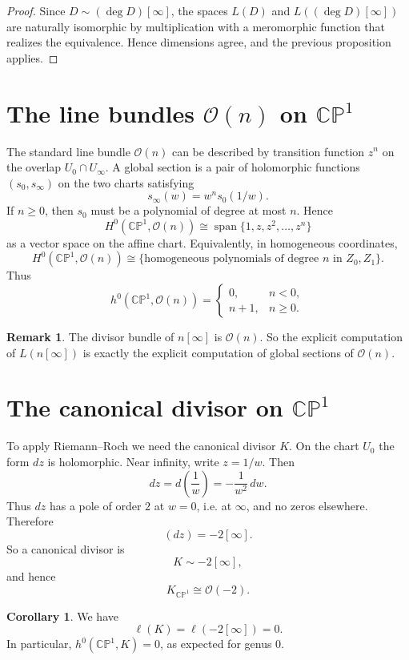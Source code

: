 \documentclass[11pt]{article}
\newcommand{\CP}{\mathbb{CP}}
\newcommand{\OO}{\mathcal{O}}
\newcommand{\degd}{\operatorname{deg}}
\newcommand{\ellD}{\ell}
\newcommand{\CPone}{\CP^1}
\theoremstyle{definition}
\newtheorem{remark}[definition]{Remark}
\newtheorem{corollary}[definition]{Corollary}
\theoremstyle{plain}
\begin{document}
\begin{proof}
Since $D\sim (\degd D)[\infty]$, the spaces $L(D)$ and $L((\degd D)[\infty])$ are naturally isomorphic by multiplication with a meromorphic function that realizes the equivalence. Hence dimensions agree, and the previous proposition applies.
\end{proof}

\section{The line bundles \texorpdfstring{$\OO(n)$}{O(n)} on \texorpdfstring{$\CPone$}{CP1}}
The standard line bundle $\OO(n)$ can be described by transition function $z^n$ on the overlap $U_0\cap U_\infty$.
A global section is a pair of holomorphic functions $(s_0,s_\infty)$ on the two charts satisfying
\[
s_\infty(w)=w^n s_0(1/w).
\]
If $n\ge 0$, then $s_0$ must be a polynomial of degree at most $n$.
Hence
\[
H^0(\CPone,\OO(n))\cong \operatorname{span}\{1,z,z^2,\dots,z^n\}
\]
as a vector space on the affine chart.
Equivalently, in homogeneous coordinates,
\[
H^0(\CPone,\OO(n))\cong \{
\text{homogeneous polynomials of degree }n\text{ in }Z_0,Z_1
\}.
\]
Thus
\[
h^0(\CPone,\OO(n))=
\begin{cases}
0,& n<0,\\
 n+1,& n\ge 0.
\end{cases}
\]

\begin{remark}
The divisor bundle of $n[\infty]$ is $\OO(n)$. So the explicit computation of $L(n[\infty])$ is exactly the explicit computation of global sections of $\OO(n)$.
\end{remark}

\section{The canonical divisor on \texorpdfstring{$\CPone$}{CP1}}
To apply Riemann--Roch we need the canonical divisor $K$.
On the chart $U_0$ the form $dz$ is holomorphic. Near infinity, write $z=1/w$. Then
\[
dz=d\left(\frac{1}{w}\right)=-\frac{1}{w^2}\,dw.
\]
Thus $dz$ has a pole of order $2$ at $w=0$, i.e. at $\infty$, and no zeros elsewhere. Therefore
\[
(dz)=-2[\infty].
\]
So a canonical divisor is
\[
K\sim -2[\infty],
\]
and hence
\[
K_{\CPone}\cong \OO(-2).
\]

\begin{corollary}
We have
\[
\ellD(K)=\ellD(-2[\infty])=0.
\]
In particular, $h^0(\CPone,K)=0$, as expected for genus $0$.
\end{corollary}
\end{document}
